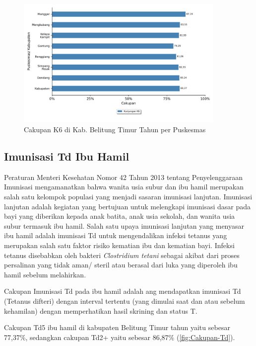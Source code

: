 \begin{figure}[H]
	\centering{}
    \includegraphics[width=0.9\textwidth]{bab_05/bab_05_03c_K6}
	\caption{Cakupan K6 di Kab. Belitung Timur Tahun \tP per Puskesmas}
	\label{fig:Cakupan-K6}
\end{figure}

\subsection{Imunisasi Td Ibu Hamil}
Peraturan Menteri Kesehatan Nomor 42 Tahun 2013 tentang Penyelenggaraan Imunisasi mengamanatkan bahwa wanita usia subur dan ibu hamil merupakan salah satu kelompok populasi yang menjadi sasaran imunisasi lanjutan.
Imunisasi lanjutan adalah kegiatan yang bertujuan untuk melengkapi imunisasi dasar pada bayi yang diberikan kepada anak batita, anak usia sekolah, dan wanita usia subur termasuk ibu hamil.
Salah satu upaya imunisasi lanjutan yang menyasar ibu hamil adalah imunisasi Td untuk mengendalikan infeksi tetanus yang merupakan salah satu faktor risiko kematian ibu dan kematian bayi.
Infeksi tetanus disebabkan oleh bakteri \emph{Clostridium tetani} sebagai akibat dari proses persalinan yang tidak aman/ steril atau berasal dari luka yang diperoleh ibu hamil sebelum melahirkan.

Cakupan Imunisasi Td pada ibu hamil adalah ang mendapatkan imunisasi Td (Tetanus difteri) dengan interval tertentu (yang dimulai saat dan atau sebelum kehamilan) dengan memperhatikan hasil skrining dan status T.

Cakupan Td5 ibu hamil di kabupaten Belitung Timur tahun \tP yaitu sebesar 77,37\%, sedangkan cakupan Td2+ yaitu sebesar 86,87\% (\autoref{fig:Cakupan-Td}).

